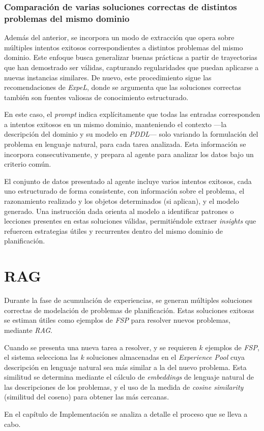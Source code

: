 \subsubsection{Comparación de varias soluciones correctas de distintos problemas del mismo dominio}

Además del anterior, se incorpora un modo de extracción que opera sobre múltiples intentos exitosos correspondientes a distintos problemas del mismo dominio. Este enfoque busca generalizar buenas prácticas a partir de trayectorias que han demostrado ser válidas, capturando regularidades que puedan aplicarse a nuevas instancias similares. De nuevo, este procedimiento sigue las recomendaciones de \textit{ExpeL}, donde se argumenta que las soluciones correctas también son fuentes valiosas de conocimiento estructurado.

En este caso, el \textit{prompt} indica explícitamente que todas las entradas corresponden a intentos exitosos en un mismo dominio, manteniendo el contexto —la descripción del dominio y su modelo en \textit{PDDL}— solo variando la formulación del problema en lenguaje natural, para cada tarea analizada. Esta información se incorpora consecutivamente, y prepara al agente para analizar los datos bajo un criterio común.

El conjunto de datos presentado al agente incluye varios intentos exitosos, cada uno estructurado de forma consistente, con información sobre el problema, el razonamiento realizado y los objetos determinados (si aplican), y el modelo generado. Una instrucción dada orienta al modelo a identificar patrones o lecciones presentes en estas soluciones válidas, permitiéndole extraer \textit{insights} que refuercen estrategias útiles y recurrentes dentro del mismo dominio de planificación.

\section{RAG}

Durante la fase de acumulación de experiencias, se generan múltiples soluciones correctas de modelación de problemas de planificación. Estas soluciones exitosas se estiman útiles como ejemplos de \textit{FSP} para resolver nuevos problemas, mediante \textit{RAG}.

Cuando se presenta una nueva tarea a resolver, y se requieren $k$ ejemplos de \textit{FSP}, el sistema selecciona las $k$ soluciones almacenadas en el \textit{Experience Pool} cuya descripción en lenguaje natural sea más similar a la del nuevo problema. Esta similitud se determina mediante el cálculo de \textit{embeddings} de lenguaje natural de las descripciones de los problemas, y el uso de la medida de \textit{cosine similarity} (similitud del coseno) para obtener las más cercanas.

En el capítulo de Implementación se analiza a detalle el proceso que se lleva a cabo.